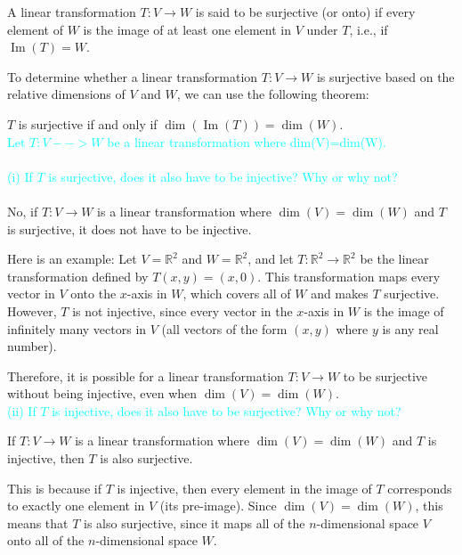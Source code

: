 \documentclass[fontsize=12pt]{scrartcl}
\begin{document}
\noindent
A linear transformation $T: V \rightarrow W$ is said to be surjective (or onto) if every element of $W$ is the image of at least one element in $V$ under $T$, i.e., if $\operatorname{Im}(T) = W$.

\noindent
To determine whether a linear transformation $T: V \rightarrow W$ is surjective based on the relative dimensions of $V$ and $W$, we can use the following theorem:

\noindent
$T$ is surjective if and only if $\operatorname{dim}(\operatorname{Im}(T)) = \operatorname{dim}(W)$.
\\

\noindent
\textcolor{cyan}{Let $T:V-->W$ be a linear transformation where dim(V)=dim(W).}\\
\\
\textcolor{cyan}{(i) If $T$ is surjective, does it also have to be injective? Why or why not?}\\
\\ No, if $T:V\rightarrow W$ is a linear transformation where $\operatorname{dim}(V) = \operatorname{dim}(W)$ and $T$ is surjective, it does not have to be injective.

\noindent
Here is an example: Let $V = \mathbb{R}^2$ and $W = \mathbb{R}^2$, and let $T: \mathbb{R}^2 \rightarrow \mathbb{R}^2$ be the linear transformation defined by $T(x,y) = (x,0)$. This transformation maps every vector in $V$ onto the $x$-axis in $W$, which covers all of $W$ and makes $T$ surjective. However, $T$ is not injective, since every vector in the $x$-axis in $W$ is the image of infinitely many vectors in $V$ (all vectors of the form $(x,y)$ where $y$ is any real number).

\noindent
Therefore, it is possible for a linear transformation $T:V\rightarrow W$ to be surjective without being injective, even when $\operatorname{dim}(V) = \operatorname{dim}(W)$.
\\

\textcolor{cyan}{(ii) If $T$ is injective, does it also have to be surjective? Why or why not?}

\noindent
If $T:V\rightarrow W$ is a linear transformation where $\operatorname{dim}(V) = \operatorname{dim}(W)$ and $T$ is injective, then $T$ is also surjective.

\noindent
This is because if $T$ is injective, then every element in the image of $T$ corresponds to exactly one element in $V$ (its pre-image). Since $\operatorname{dim}(V) = \operatorname{dim}(W)$, this means that $T$ is also surjective, since it maps all of the $n$-dimensional space $V$ onto all of the $n$-dimensional space $W$.
\end{document}
